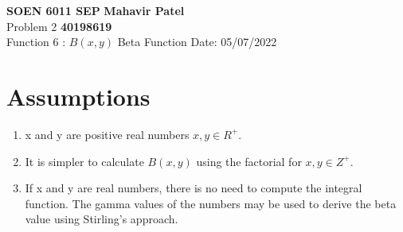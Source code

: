 \documentclass[a4paper, 12pt]{article}
\begin{document}
\noindent
\large\textbf{SOEN 6011 SEP} \hfill \textbf{Mahavir Patel} \\
\normalsize Problem 2 \hfill \textbf{40198619} \\
Function 6 :  $B(x,y)$ Beta Function \hfill Date: 05/07/2022 \\

\section*{Assumptions}
    \begin{enumerate}[noitemsep]
        \item x and y are positive real numbers $x,y \in R^{+}$.
        \item It is simpler to calculate $B(x,y)$ using the factorial for $x,y \in Z^{+}$.
        \item If x and y are real numbers, there is no need to compute the integral function. The gamma values of the numbers may be used to derive the beta value using Stirling's approach. 
    \end{enumerate}
\end{document}
